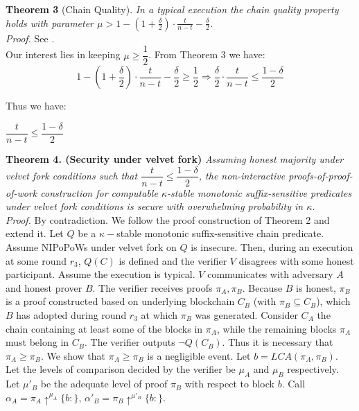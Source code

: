 \documentclass[11pt,a4paper]{article}
\begin{document}
\textbf{Theorem 3 }(Chain Quality)\cite{Backbone}. \textit{In a typical execution the chain quality property holds with parameter $\mu > 1 - (1 + \frac{\delta}{2}) \cdot \frac{t}{n-t} - \frac{\delta}{2}$.}\\
\textit{Proof.} See \cite{Backbone}.\\

Our interest lies in keeping $\mu \geq \dfrac{1}{2}$.
From Theorem 3 we have:
\begin{equation*}
1 - (1 + \frac{\delta}{2}) \cdot \frac{t}{n-t} - \frac{\delta}{2} \geq \dfrac{1}{2} \Rightarrow 
\frac{\delta}{2} \cdot \frac{t}{n-t} \leq \frac{1-\delta}{2}
\end{equation*}

Thus we have:
\begin{center}
$  \dfrac{t}{n-t} \leq \dfrac{1-\delta}{2} $
\end{center}

\textbf{Theorem 4. (Security under velvet fork)} \textit{Assuming honest majority under velvet fork conditions such that $\dfrac{t}{n-t} \leq \dfrac{1-\delta}{2}$, the non-interactive proofs-of-proof-of-work construction for computable $\kappa$-stable monotonic suffix-sensitive predicates under velvet fork conditions is secure with overwhelming probability in $\kappa$.}\\

\textit{Proof.} By contradiction. We follow the proof construction of Theorem 2 and extend it. Let $Q$ be a $\kappa-$stable monotonic suffix-sensitive chain predicate. Assume NIPoPoWs under velvet fork on $Q$ is insecure. Then, during an execution at some round  $r_3$, $Q(C)$ is defined and the verifier $V$ disagrees with some honest participant. Assume the execution is typical. $V$ communicates with adversary $A$ and honest prover $B$. The verifier receives proofs $\pi_A, \pi_B$. Because $B$ is honest, $\pi_B$ is a proof constructed based on underlying blockchain $C_B$ (with $\pi_B \subseteq C_B$), which $B$ has adopted during round $r_3$ at which $\pi_B$ was generated. Consider $C_A$ the chain containing at least some of the blocks in $\pi_A$, while the remaining blocks $\pi_A$ must belong in $C_B$. 
The verifier outputs $\neg Q(C_B)$. Thus it is necessary that $\pi_A \geq \pi_B$. We show that $\pi_A \geq \pi_B$ is a negligible event. 
Let $b = LCA(\pi_A, \pi_B)$. Let the levels of comparison decided by the verifier be $\mu_A$ and $\mu_B$ respectively. Let $\mu'_B$ be the adequate level of proof $\pi_B$  with respect to block $b$. Call $\alpha_A = \pi_A \uparrow^{\mu_A}\{b:\}$, 
$\alpha'_B = \pi_B \uparrow^{\mu'_B}\{b:\}$.
\end{document}
